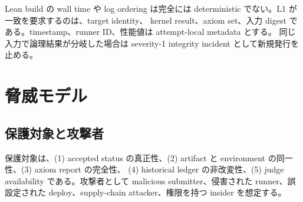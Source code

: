 \documentclass[a4paper,11pt]{ltjsarticle}
\begin{document}
Lean build の wall time や log ordering は完全には deterministic でない。L1 が一致を要求するのは、target identity、
kernel result、axiom set、入力 digest である。timestamp、runner ID、性能値は attempt-local metadata とする。
同じ入力で論理結果が分岐した場合は severity-1 integrity incident として新規発行を止める。

\section{脅威モデル}

\subsection{保護対象と攻撃者}

保護対象は、(1) accepted status の真正性、(2) artifact と environment の同一性、(3) axiom report の完全性、
(4) historical ledger の非改変性、(5) judge availability である。攻撃者として malicious submitter、侵害された
runner、誤設定された deploy、supply-chain attacker、権限を持つ insider を想定する。
\end{document}
